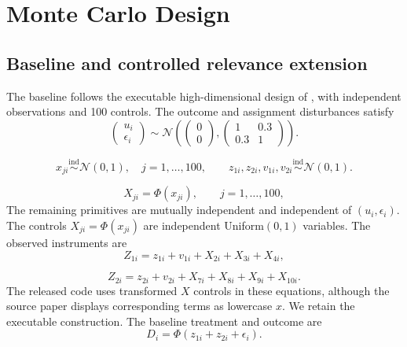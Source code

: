 \section{Monte Carlo Design}
\label{chap:monte-carlo-design}
\subsection{Baseline and controlled relevance extension}
\label{sec:monte-carlo-design}
The baseline follows the executable high-dimensional design of \textcite{chen_huang_tien_2021}, with independent observations and 100 controls. The outcome and assignment disturbances satisfy
\begin{equation}
  \begin{pmatrix}
    u_i \\
    \epsilon_i
  \end{pmatrix}
  \sim
  \mathcal{N}\!\left(
    \begin{pmatrix} 0 \\ 0 \end{pmatrix},
    \begin{pmatrix} 1 & 0.3 \\ 0.3 & 1 \end{pmatrix}
  \right).
  \label{eq:dgp-disturbances}
\end{equation}

\begin{equation}
  x_{ji}\overset{\mathrm{ind}}{\sim}\mathcal{N}(0,1),
  \quad j=1,\ldots,100,
  \qquad
  z_{1i},z_{2i},v_{1i},v_{2i}
  \overset{\mathrm{ind}}{\sim}\mathcal{N}(0,1).
  \label{eq:dgp-primitives}
\end{equation}

\begin{equation}
  X_{ji}=\Phi(x_{ji}),
  \qquad j=1,\ldots,100,
  \label{eq:dgp-controls}
\end{equation}
The remaining primitives are mutually independent and independent of $(u_i,\epsilon_i)$. The controls $X_{ji}=\Phi(x_{ji})$ are independent Uniform$(0,1)$ variables. The observed instruments are
\begin{equation}
  Z_{1i}=z_{1i}+v_{1i}+X_{2i}+X_{3i}+X_{4i},
  \label{eq:dgp-instrument1}
\end{equation}

\begin{equation}
  Z_{2i}=z_{2i}+v_{2i}+X_{7i}+X_{8i}+X_{9i}+X_{10i}.
  \label{eq:dgp-instrument2}
\end{equation}
The released code uses transformed $X$ controls in these equations, although the source paper displays corresponding terms as lowercase $x$. We retain the executable construction. The baseline treatment and outcome are
\begin{equation}
  D_i=\Phi(z_{1i}+z_{2i}+\epsilon_i).
  \label{eq:dgp-treatment-baseline}
\end{equation}

